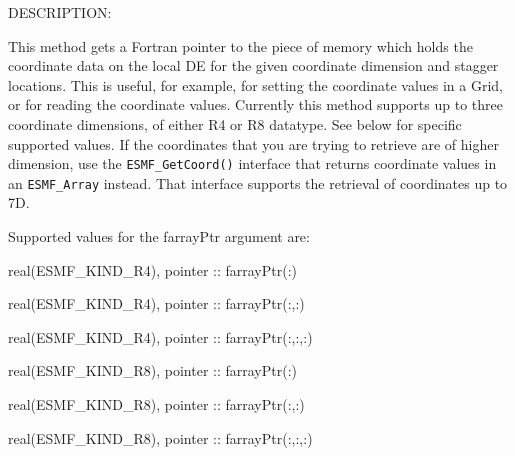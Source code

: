 {\sf DESCRIPTION:\\ }


       This method gets a Fortran pointer to the piece of memory which holds the
       coordinate data on the local DE for the given coordinate dimension and stagger
       locations.
       This is useful, for example, for setting the coordinate values in a Grid, or
       for reading the coordinate values.  Currently this method supports up to three
       coordinate dimensions, of either R4 or R8 datatype.  See below for specific
       supported values.  If the coordinates that you are trying to retrieve are of
       higher dimension, use the {\tt ESMF\_GetCoord()} interface that returns coordinate
       values in an {\tt ESMF\_Array} instead.  That interface supports the retrieval of
       coordinates up to 7D.
  
       Supported values for the farrayPtr argument are:
       \begin{description}
       \item real(ESMF\_KIND\_R4), pointer :: farrayPtr(:)
       \item real(ESMF\_KIND\_R4), pointer :: farrayPtr(:,:)
       \item real(ESMF\_KIND\_R4), pointer :: farrayPtr(:,:,:)
       \item real(ESMF\_KIND\_R8), pointer :: farrayPtr(:)
       \item real(ESMF\_KIND\_R8), pointer :: farrayPtr(:,:)
       \item real(ESMF\_KIND\_R8), pointer :: farrayPtr(:,:,:)
       \end{description}
  
